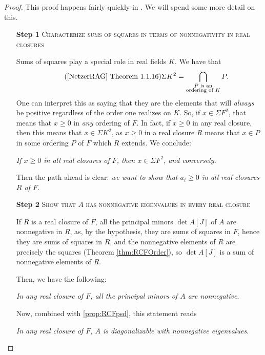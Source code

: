 \documentclass{article}
\begin{document}
\begin{proof}
    This proof happens fairly quickly in \cite{HN06}.
    We will spend some more detail on this.
    \begin{itemize}
        \item[\textbf{Step 1}]
            \textsc{\color{Crimson} Characterize sums of squares in terms of nonnegativity in real closures}

            Sums of squares play a special role in real fields $K$.
            We have that
            \[
                \tag{\cite{NetzerRAG} Theorem 1.1.16}
                \Sigma K^2
                =
                \bigcap_{\substack{\text{$P$ is an}\\\text{ordering of $K$}}} P.
            \]
            One can interpret this as saying that they are the elements that will \textit{always} be positive regardless of the order one realizes on $K$.
            So, if $x \in \Sigma F^2$, that means that $x \geq 0$ in \textit{any} ordering of $F$. 
            In fact, if $x \geq 0$ in any real closure, then this means that $x \in \Sigma K^2$, as $x \geq 0$ in a real closure $R$ means that $x \in P$ in some ordering $P$ of $F$ which $R$ extends.
            We conclude:
            \begin{center}
                \textit{If $x \geq 0$ in all real closures of $F$, then $x \in \Sigma F^2$, and conversely.}
            \end{center}
            Then the path ahead is clear: \textit{we want to show that $a_i \geq 0$ in all real closures $R$ of $F$}.

        \item[\textbf{Step 2}]
            \textsc{\color{Crimson} Show that $A$ has nonnegative eigenvalues in every real closure}

            If $R$ is a real closure of $F$, all the principal minors $\det A[J]$ of $A$ are nonnegative in $R$, as, by the hypothesis, they are sums of squares in $F$, hence they are sums of squares in $R$, and the nonnegative elements of $R$ are precisely the squares (Theorem \ref{thm:RCFOrder}), so $\det A[J]$ is a sum of nonnegative elements of $R$.

            Then, we have the following:
            \begin{center}
                \textit{In any real closure of $F$, all the principal minors of $A$ are nonnegative}.
            \end{center}
            Now, combined with \ref{prop:RCFpsd}, this statement reads
            \begin{center}
                \textit{In any real closure of $F$, $A$ is diagonalizable with nonnegative eigenvalues}.
            \end{center}


\end{itemize}
\end{proof}
\end{document}
